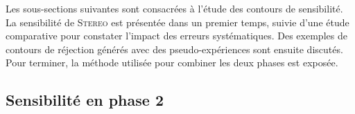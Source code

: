 \bigbreak

Les sous-sections suivantes sont consacrées à l'étude des contours de sensibilité. La sensibilité de \textsc{Stereo} est présentée dans un premier temps, suivie d'une étude comparative pour constater l'impact des erreurs systématiques. Des exemples de contours de réjection générés avec des pseudo-expériences sont ensuite discutés. Pour terminer, la méthode utilisée pour combiner les deux phases est exposée.

\bigbreak

\subsection{Sensibilité en phase 2}
\label{sec:sensitivity_phase_2_example}


